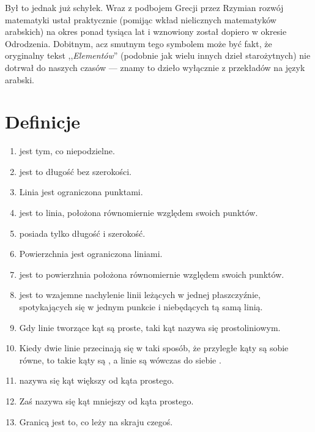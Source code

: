 \documentclass[12pt, a4paper]{article}
\begin{document}
Był to jednak już schyłek. Wraz z podbojem Grecji przez Rzymian rozwój
matematyki ustał praktycznie (pomijąc wkład nielicznych matematyków arabskich)
na okres ponad tysiąca lat i wznowiony został dopiero w okresie Odrodzenia.
Dobitnym, acz smutnym tego symbolem może być fakt, że oryginalny tekst
,,\emph{Elementów}'' (podobnie jak wielu innych dzieł starożytnych) nie dotrwał
do naszych czasów --- znamy to dzieło wyłącznie z przekładów na język arabski.

\pagebreak

\section*{Definicje}

\begin{enumerate}
    \itemsep0em
    \item \mkdef {} jest tym, co niepodzielne.
    \item \mkdef {} jest to długość bez szerokości.
    \item \mkdef Linia jest ograniczona punktami.
    \item \mkdef
         jest to linia, położona równomiernie względem swoich
        punktów.
    \item \mkdef {} posiada tylko długość i szerokość.
    \item \mkdef Powierzchnia jest ograniczona liniami.
    \item \mkdef
         jest to powierzhnia położona równomiernie względem
        swoich punktów.
    \item \mkdef
         jest to wzajemne nachylenie linii leżących w jednej
        płaszczyźnie, spotykających się w jednym punkcie i niebędących tą samą
        linią.
    \item \mkdef
        Gdy linie tworzące kąt są proste, taki kąt nazywa się prostoliniowym.
    \item \mkdef
        Kiedy dwie linie przecinają się w taki sposób, że przyległe kąty są
        sobie równe, to takie kąty są , a linie są wówczas
        do siebie .
    \item \mkdef {} nazywa się kąt większy od kąta prostego.
    \item \mkdef Zaś  nazywa się kąt mniejszy od kąta prostego.
    \item \mkdef Granicą jest to, co leży na skraju czegoś.

\end{enumerate}
\end{document}
